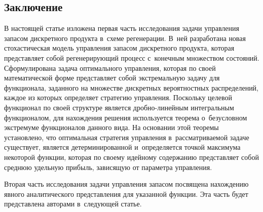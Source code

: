 \begin{multicols}{2}
\section{Заключение}

  В настоящей статье изложена первая часть исследования задачи управ\-ле\-ния 
запасом дискретного продукта в~схеме регенерации. В~ней разработана новая 
стохастическая модель управ\-ле\-ния запасом дискретного продукта, которая 
представляет собой регенерирующий процесс с~конечным множеством 
состояний. Сформулирована задача оптимального управ\-ле\-ния, которая по 
своей математической форме представляет собой экстремальную задачу для 
функционала, заданного на множестве дискретных вероятностных 
распределений, каждое из которых определяет стратегию управ\-ле\-ния. 
Поскольку целевой функционал по своей структуре является  
дроб\-но-ли\-ней\-ным интегральным функционалом, для нахождения решения 
используется тео\-ре\-ма о~безусловном экстремуме функционалов данного вида. 
На основании этой тео\-ре\-мы установлено, что оптимальная стратегия 
управления в~рас\-смат\-ри\-ва\-емой задаче существует, является 
детерминированной и~определяется точ\-кой максимума некоторой функции, 
которая по своему идейному содержанию пред\-став\-ля\-ет собой среднюю 
удельную прибыль, зависящую от параметра управ\-ле\-ния. 

Вторая часть 
исследования задачи управ\-ле\-ния запасом посвящена на\-хож\-де\-нию явного 
аналитического пред\-став\-ле\-ния для указанной функции. Эта часть будет 
представлена авторами в~сле\-ду\-ющей статье.


\end{multicols}
